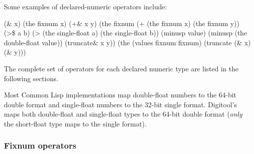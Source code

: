 \documentclass[10pt,twoside,english,pdftex]{article}
\begin{document}
Some examples of declared-numeric operators include:
%
\W\supp
\begin{example}
  (\& x) \expands (the fixnum x)
  (+\& x y) \expands (the fixnum (+ (the fixnum x) (the fixnum y))
  (>\$ a b) \expands (> (the single-float a) (the single-float b))
  (minusp$$ value) \expands (minusp (the double-float value))
  (truncate\& x y)) \expands (the (values fixnum fixnum) (truncate (\& x) (\& y)))
\end{example}
%
The complete set of operators for each declared numeric type are listed in the
following sections.

\fnnotes 
{}%
%
%
%
%
%
Most Common Lisp implementations map double-float numbers to the
64-bit 
double format and single-float numbers to the 32-bit 
single format.  Digitool's  maps both double-float and
single-float types to the 64-bit 
double format (\textit{only\/} the short-float type maps to the
single format).  

\T\clearpage
\W{}
\subsubsection{Fixnum  operators}
\end{document}
